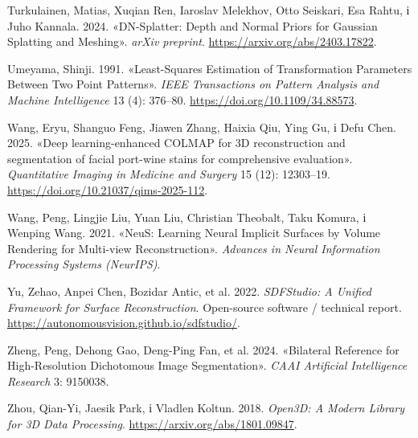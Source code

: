 \documentclass[
  ukrainian,
  10pt,
  a4paper,
  twocolumn]{article}
\newlength{\cslhangindent}
\newenvironment{CSLReferences}[2] %
 {\begin{list}{}{%
  \setlength{\itemindent}{0pt}
  \setlength{\leftmargin}{0pt}
  \setlength{\parsep}{0pt}
  \ifodd #1
   \setlength{\leftmargin}{\cslhangindent}
   \setlength{\itemindent}{-1\cslhangindent}
  \fi
  \setlength{\itemsep}{#2\baselineskip}}}
 {\end{list}}
\begin{document}
\begin{CSLReferences}{1}{1}
Turkulainen, Matias, Xuqian Ren, Iaroslav Melekhov, Otto Seiskari, Esa
Rahtu, і Juho Kannala. 2024. {«{DN-Splatter}: Depth and Normal Priors
for {Gaussian} Splatting and Meshing»}. \emph{arXiv preprint}.
\url{https://arxiv.org/abs/2403.17822}.

Umeyama, Shinji. 1991. {«Least-Squares Estimation of Transformation
Parameters Between Two Point Patterns»}. \emph{IEEE Transactions on
Pattern Analysis and Machine Intelligence} 13 (4): 376--80.
\url{https://doi.org/10.1109/34.88573}.

Wang, Eryu, Shanguo Feng, Jiawen Zhang, Haixia Qiu, Ying Gu, і Defu
Chen. 2025. {«Deep learning-enhanced {COLMAP} for {3D} reconstruction
and segmentation of facial port-wine stains for comprehensive
evaluation»}. \emph{Quantitative Imaging in Medicine and Surgery} 15
(12): 12303--19. \url{https://doi.org/10.21037/qims-2025-112}.

Wang, Peng, Lingjie Liu, Yuan Liu, Christian Theobalt, Taku Komura, і
Wenping Wang. 2021. {«{NeuS}: Learning Neural Implicit Surfaces by
Volume Rendering for Multi-view Reconstruction»}. \emph{Advances in
Neural Information Processing Systems (NeurIPS)}.

Yu, Zehao, Anpei Chen, Bozidar Antic, et al. 2022. \emph{{SDFStudio}: A
Unified Framework for Surface Reconstruction}. Open-source software /
technical report. \url{https://autonomousvision.github.io/sdfstudio/}.

Zheng, Peng, Dehong Gao, Deng-Ping Fan, et al. 2024. {«Bilateral
Reference for High-Resolution Dichotomous Image Segmentation»}.
\emph{CAAI Artificial Intelligence Research} 3: 9150038.

Zhou, Qian-Yi, Jaesik Park, і Vladlen Koltun. 2018. \emph{Open{3D}: A
Modern Library for {3D} Data Processing}.
\url{https://arxiv.org/abs/1801.09847}.

\end{CSLReferences}
\end{document}
